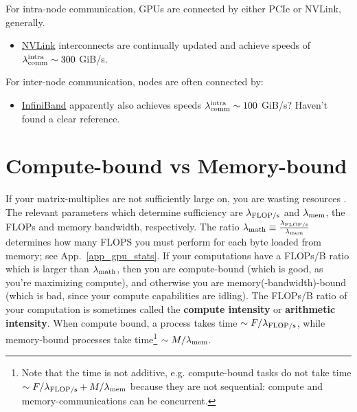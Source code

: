 \documentclass[11pt]{article}
\begin{document}
For intra-node communication, GPUs are connected by either PCIe or NVLink, generally.
\begin{itemize}
    \item \href{https://blogs.nvidia.com/blog/2023/03/06/what-is-nvidia-nvlink/}{NVLink}
        interconnects are continually updated and achieve speeds of $ \lambda _{ {\rm comm} } ^{
        {\rm intra} } \sim 300$ GiB/s.
\end{itemize}


For inter-node communication, nodes are often connected by:
\begin{itemize}
    \item \href{https://en.wikipedia.org/wiki/InfiniBand}{InfiniBand} apparently also achieves speeds $ \lambda _{ {\rm comm} } ^{
        {\rm intra} } \sim 100$ GiB/s?  Haven't found a clear reference.
\end{itemize}



\section{Compute-bound vs Memory-bound \label{app_compute_mem_bound} }

If your matrix-multiplies are not sufficiently large on, you are wasting resources
\cite{he2022brrrrfromfirstprinciples}. The relevant parameters which determine sufficiency are $
\lambda _{ {\rm FLOP/s}  } $ and $ \lambda _{ {\rm mem}  } $, the FLOPs and memory bandwidth,
respectively. The ratio $  \lambda _{ {\rm math}  } \equiv \frac{  \lambda _{ {\rm FLOP/s}  } }{
\lambda _{ {\rm mem}  } }   $ determines how many FLOPS you must perform for each byte loaded from
memory; see App.~\ref{app_gpu_stats}. If your computations have a FLOPs/B ratio which is larger than
$ \lambda _{ {\rm math}  } $, then you are compute-bound (which is good, as you're maximizing
compute), and otherwise you are memory(-bandwidth)-bound (which is bad, since your compute
capabilities are idling). The FLOPs/B ratio of your computation is sometimes called the
\textbf{compute intensity} or \textbf{arithmetic intensity}. When compute bound, a process takes
time $ \sim F/\lambda _{ {\rm FLOP/s} } $, while memory-bound processes take time\footnote{Note that
the time is not additive, e.g. compute-bound tasks do not take time $ \sim F/\lambda _{ {\rm FLOP/s}
} +M/\lambda _{ {\rm mem} }$ because they are not sequential: compute and memory-communications can
be concurrent.} $ \sim M/\lambda _{ {\rm mem} } $.
\end{document}
